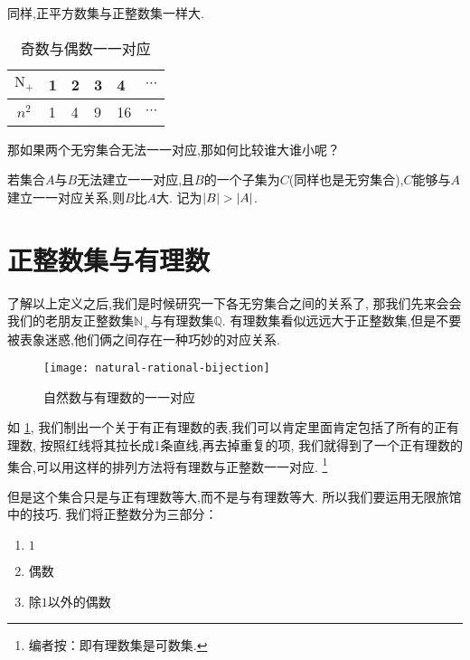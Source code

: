 \documentclass[UTF8]{mathrep}
\begin{document}
同样,正平方数集与正整数集一样大.

\begin{table}[!h]
	\begin{center}
		\begin{tabular}{c|lllll}
			\toprule
			$\mathrm N_+$ & 1 & 2 & 3 & 4  & $\cdots$ \\
			\midrule
			$n^2$         & 1 & 4 & 9 & 16 & $\cdots$ \\
			\bottomrule
		\end{tabular}
		\caption{奇数与偶数一一对应}
	\end{center}
\end{table}

那如果两个无穷集合无法一一对应,那如何比较谁大谁小呢？

\begin{definition}
	若集合$A$与$B$无法建立一一对应,且$B$的一个子集为$C$(同样也是无穷集合),$C$能够与$A$建立一一对应关系,则$B$比$A$大.
	记为$\left\lvert B \right\rvert > \left\lvert A \right\rvert$.
\end{definition}

\section{正整数集与有理数}

了解以上定义之后,我们是时候研究一下各无穷集合之间的关系了,
那我们先来会会我们的老朋友正整数集$\mathbb N_+$与有理数集$\mathbb Q$.
有理数集看似远远大于正整数集,但是不要被表象迷惑,他们俩之间存在一种巧妙的对应关系.

\begin{figure}[htbp]
	\begin{center}
		\texttt{[image: natural-rational-bijection]}
		\caption{自然数与有理数的一一对应}
		\label{fig:bijection}
	\end{center}
\end{figure}

如 \cref{fig:bijection}, 我们制出一个关于有正有理数的表,我们可以肯定里面肯定包括了所有的正有理数,
按照红线将其拉长成1条直线,再去掉重复的项,
我们就得到了一个正有理数的集合,可以用这样的排列方法将有理数与正整数一一对应.
\footnote{编者按：即有理数集是可数集.}

但是这个集合只是与正有理数等大,而不是与有理数等大.
所以我们要运用无限旅馆中的技巧.
我们将正整数分为三部分：

\begin{enumerate}
	\item \label{enum:1} ${1}$
	\item \label{enum:2} 偶数
	\item \label{enum:3} 除$1$以外的偶数
\end{enumerate}
\end{document}

